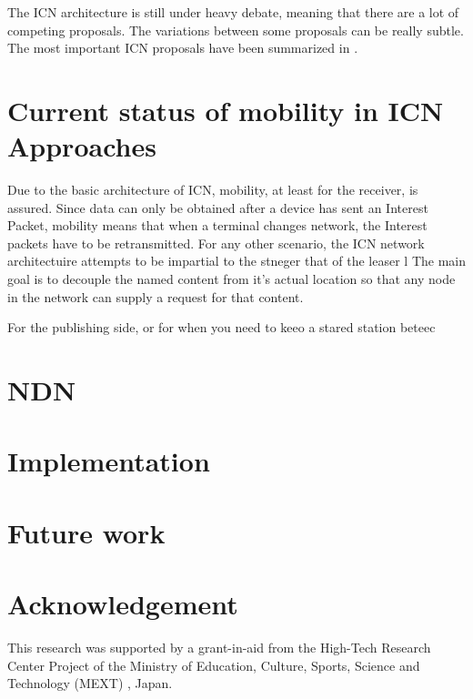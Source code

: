 \documentclass[8pt,twocolumn]{article}
\begin{document}
The ICN architecture is still under heavy debate, meaning that there are a lot
of competing proposals. The variations between some proposals can be really 
subtle. The most important ICN proposals have been summarized in \cite{6563278}.

\section{Current status of mobility in ICN Approaches}
Due to the basic architecture of ICN, mobility, at least for the receiver, is
assured. Since data can only be obtained after a device has sent an Interest
Packet, mobility means that when a terminal changes network, the Interest 
packets have to be retransmitted. For any other scenario, the ICN network
architectuire attempts to be impartial to the stneger that of the leaser l 
The main goal is to decouple the named
content from it's actual location so that any node in the network can supply
a request for that content.  

For the publishing side, or for when you need to keeo a stared station beteec

\section{NDN}
\section{Implementation}
\section{Future work}

\section*{Acknowledgement}
This research was supported by a grant-in-aid from the High-Tech Research
Center Project of the Ministry of Education, Culture, Sports, Science and
Technology (MEXT) \cite{mext:2014:Online}, Japan.



\end{document}

